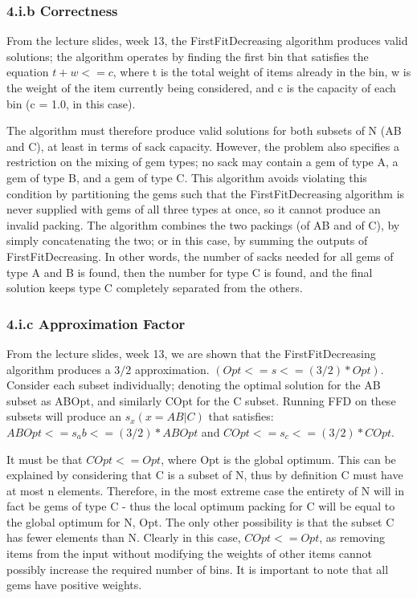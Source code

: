 \documentclass[paper=a4, fontsize=12pt]{article}
\begin{document}
\subsubsection{4.i.b Correctness}
From the lecture slides, week 13, the FirstFitDecreasing algorithm produces valid solutions; the algorithm operates by finding the first bin that satisfies the equation \(t + w <= c\), where t is the total weight of items already in the bin, w is the weight of the item currently being considered, and c is the capacity of each bin (c = 1.0, in this case).

The algorithm must therefore produce valid solutions for both subsets of N (AB and C), at least in terms of sack capacity. However, the problem also specifies a restriction on the mixing of gem types; no sack may contain a gem of type A, a gem of type B, and a gem of type C. This algorithm avoids violating this condition by partitioning the gems such that the FirstFitDecreasing algorithm is never supplied with gems of all three types at once, so it cannot produce an invalid packing. The algorithm combines the two packings (of AB and of C), by simply concatenating the two; or in this case, by summing the outputs of FirstFitDecreasing. In other words, the number of sacks needed for all gems of type A and B is found, then the number for type C is found, and the final solution keeps type C completely separated from the others.

\subsubsection{4.i.c Approximation Factor}
From the lecture slides, week 13, we are shown that the FirstFitDecreasing algorithm produces a \(3/2\) approximation. \((Opt <= s <= (3/2) * Opt)\). Consider each subset individually; denoting the optimal solution for the AB subset as ABOpt, and similarly COpt for the C subset. Running FFD on these subsets will produce an \(s_x (x = AB | C)\) that satisfies: \(ABOpt <= s_ab <= (3/2) * ABOpt\) and \(COpt <= s_c <= (3/2) * COpt\).

It must be that \(COpt <= Opt\), where Opt is the global optimum. This can be explained by considering that C is a subset of N, thus by definition C must have at most n elements. Therefore, in the most extreme case the entirety of N will in fact be gems of type C - thus the local optimum packing for C will be equal to the global optimum for N, Opt. The only other possibility is that the subset C has fewer elements than N. Clearly in this case, \(COpt <= Opt\), as removing items from the input without modifying the weights of other items cannot possibly increase the required number of bins. It is important to note that all gems have positive weights.
\end{document}
